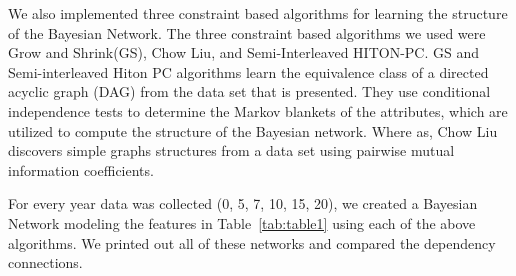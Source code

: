  
We also implemented three constraint based algorithms for learning the structure of the Bayesian Network.  The three constraint based algorithms we used were Grow and Shrink(GS), Chow Liu, and Semi-Interleaved HITON-PC. GS and Semi-interleaved Hiton PC algorithms learn the equivalence class of a directed acyclic graph (DAG) from the data set that is presented.\cite{scutari2017package}  They use conditional independence tests to determine the Markov blankets of the attributes, which are utilized to compute the structure of the Bayesian network. \cite{scutari2017package}  Where as, Chow Liu discovers simple graphs structures from a data set using pairwise mutual information coefficients.\cite{scutari2017package}  

For every year data was collected (0, 5, 7, 10, 15, 20), we created a Bayesian Network modeling the features in Table~\ref{tab:table1} using each of the above algorithms. We printed out all of these networks and compared the dependency connections. 



